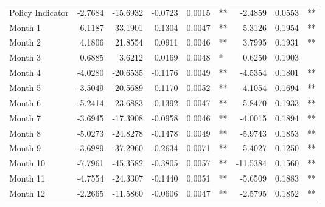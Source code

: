 \begin{table}
\begin{tabular}{l r r r r l r r l}
Policy Indicator          &  -2.7684        &  -15.6932       &  -0.0723        &  0.0015       &   **       &  -2.4859        &  0.0553       &   **       \\ 
Month 1                         &  6.1187        &  33.1901       &  0.1304        &  0.0047       &   **       &  5.3126        &  0.1954       &   **       \\ 
Month 2                         &  4.1806        &  21.8554       &  0.0911        &  0.0046       &   **       &  3.7995        &  0.1931       &   **       \\ 
Month 3                         &  0.6885        &  3.6212       &  0.0169        &  0.0048       &    *       &  0.6250        &  0.1903       &            \\ 
Month 4                         &  -4.0280        &  -20.6535       &  -0.1176        &  0.0049       &   **       &  -4.5354        &  0.1801       &   **       \\ 
Month 5                         &  -3.5049        &  -20.5689       &  -0.1170        &  0.0052       &   **       &  -4.1054        &  0.1694       &   **       \\ 
Month 6                         &  -5.2414        &  -23.6883       &  -0.1392        &  0.0047       &   **       &  -5.8470        &  0.1933       &   **       \\ 
Month 7                         &  -3.6945        &  -17.3908       &  -0.0958        &  0.0046       &   **       &  -4.0015        &  0.1894       &   **       \\ 
Month 8                         &  -5.0273        &  -24.8278       &  -0.1478        &  0.0049       &   **       &  -5.9743        &  0.1853       &   **       \\ 
Month 9                         &  -3.6989        &  -37.2960       &  -0.2634        &  0.0071       &   **       &  -5.4027        &  0.1250       &   **       \\ 
Month 10                        &  -7.7961        &  -45.3582       &  -0.3805        &  0.0057       &   **       &  -11.5384        &  0.1560       &   **       \\ 
Month 11                        &  -4.7554        &  -24.3307       &  -0.1440        &  0.0051       &   **       &  -5.6509        &  0.1883       &   **       \\ 
Month 12                        &  -2.2665        &  -11.5860       &  -0.0606        &  0.0047       &   **       &  -2.5795        &  0.1852       &   **       \\ 


\end{tabular}
\end{table}
